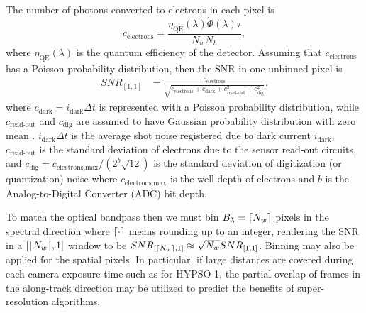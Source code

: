 The number of photons converted to electrons in each pixel is
\begin{equation}
c_{\text{electrons}} = \frac{\eta_{\text{QE}}(\lambda)\dot{\Phi}(\lambda)\tau}{N_{w}N_{h}}, \label{eq:photons2}
\end{equation}
\noindent where $\eta_{\text{QE}}(\lambda)$ is the quantum efficiency of the detector. Assuming that $c_{\text{electrons}}$ has a Poisson probability distribution, then the SNR in one unbinned pixel is
\begin{align}
SNR_{[1, 1]} 
&=\frac{c_{\text{electrons}}}{\sqrt{c_{\text{electrons}} + c_{\text{dark}}+c_{\text{read-out}}^2+c_{\text{dig}}^2}}.  \label{eq:snr}
\end{align}
\noindent where $c_{\text{dark}}=i_{\text{dark}}\Delta t$ is represented with a Poisson probability distribution, while $c_{\text{read-out}}$ and $c_{\text{dig}}$ are assumed to have Gaussian probability distribution with zero mean \cite{Moses2012, Skauli2011}. $i_{\text{dark}}\Delta t$ is the average shot noise registered due to dark current $i_{\text{dark}}$, $c_{\text{read-out}}$ is the standard deviation of electrons due to the sensor read-out circuits, and $c_{\text{dig}}=c_{\text{electrons},\text{max}}/(2^{b}\sqrt{12})$ is the standard deviation of digitization (or quantization) noise where $c_{\text{electrons},\text{max}}$ is the well depth of electrons and $b$ is the Analog-to-Digital Converter (ADC) bit depth.

To match the optical bandpass then we must bin $B_\lambda=\lceil N_w\rceil$ pixels in the spectral direction where $\lceil\cdot\rceil$ means rounding up to an integer, rendering the SNR in a $[\lceil N_w\rceil, 1]$ window to be $SNR_{[\lceil N_w\rceil, 1]} \approx \sqrt{N_w}SNR_{[1,1]}$. Binning may also be applied for the spatial pixels. In particular, if large distances are covered during each camera exposure time such as for HYPSO-1, the partial overlap of frames in the along-track direction may be utilized to predict the benefits of super-resolution algorithms.

